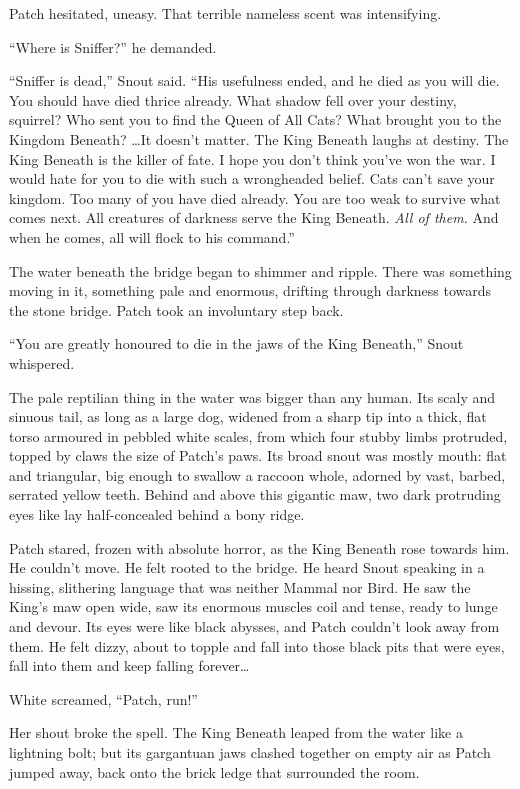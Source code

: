 \documentclass[12pt]{memoir}
\begin{document}
Patch hesitated, uneasy. That terrible nameless scent was
intensifying.

“Where is Sniffer?” he demanded.

“Sniffer is dead,” Snout said. “His usefulness ended, and he died as
you will die. You should have died thrice already. What shadow fell
over your destiny, squirrel? Who sent you to find the Queen of All
Cats? What brought you to the Kingdom Beneath? …It doesn’t matter. The
King Beneath laughs at destiny. The King Beneath is the killer of
fate. I hope you don’t think you’ve won the war. I would hate for you
to die with such a wrongheaded belief. Cats can’t save your
kingdom. Too many of you have died already. You are too weak to
survive what comes next. All creatures of darkness serve the King
Beneath. \textit{All of them.} And when he comes, all will flock to
his command.”

The water beneath the bridge began to shimmer and ripple. There was
something moving in it, something pale and enormous, drifting through
darkness towards the stone bridge. Patch took an involuntary step
back.

“You are greatly honoured to die in the jaws of the King Beneath,”
Snout whispered.

The pale reptilian thing in the water was bigger than any human. Its
scaly and sinuous tail, as long as a large dog, widened from a sharp
tip into a thick, flat torso armoured in pebbled white scales, from
which four stubby limbs protruded, topped by claws the size of Patch’s
paws. Its broad snout was mostly mouth: flat and triangular, big
enough to swallow a raccoon whole, adorned by vast, barbed, serrated
yellow teeth. Behind and above this gigantic maw, two dark protruding
eyes like lay half-concealed behind a bony ridge.

Patch stared, frozen with absolute horror, as the King Beneath rose
towards him. He couldn’t move. He felt rooted to the bridge. He heard
Snout speaking in a hissing, slithering language that was neither
Mammal nor Bird. He saw the King’s maw open wide, saw its enormous
muscles coil and tense, ready to lunge and devour. Its eyes were like
black abysses, and Patch couldn’t look away from them. He felt dizzy,
about to topple and fall into those black pits that were eyes, fall
into them and keep falling forever…

White screamed, “Patch, run!”

Her shout broke the spell. The King Beneath leaped from the water like
a lightning bolt; but its gargantuan jaws clashed together on empty
air as Patch jumped away, back onto the brick ledge that surrounded
the room.
\end{document}
